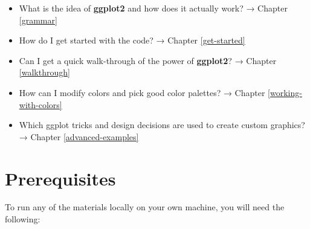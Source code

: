 \documentclass[
]{krantz}
\providecommand{\tightlist}{%
  \setlength{\itemsep}{0pt}\setlength{\parskip}{0pt}}
\begin{document}
\begin{itemize}
\tightlist
\item
  What is the idea of \textbf{ggplot2} and how does it actually work? → Chapter \ref{grammar}
\item
  How do I get started with the code? → Chapter \ref{get-started}
\item
  Can I get a quick walk-through of the power of \textbf{ggplot2}? → Chapter \ref{walkthrough}
\item
  How can I modify colors and pick good color palettes? → Chapter \ref{working-with-colors}
\item
  Which ggplot tricks and design decisions are used to create custom graphics? → Chapter \ref{advanced-examples}
\end{itemize}

\hypertarget{prerequisites}{%
\section*{Prerequisites}\label{prerequisites}}


To run any of the materials locally on your own machine, you will need the following:
\end{document}
